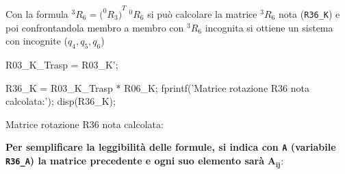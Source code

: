 \documentclass[11pt, a4paper]{article}
\begin{document}
\begin{par}
\begin{flushleft}
Con la formula $^3 R_6 ={\bigl(^0 R_3 \bigr)}^T \;^0 R_6$ si può calcolare la matrice $^3 R_6$ nota (\texttt{R36\_K}) e poi confrontandola membro a membro con $^3 R_6$ incognita si ottiene un sistema con incognite ($q_4 ,q_5 ,q_6$)
\end{flushleft}
\end{par}
\begin{matlabcode}
R03_K_Trasp = R03_K';

R36_K = R03_K_Trasp * R06_K;
fprintf('Matrice rotazione R36 nota calcolata:');
disp(R36_K);
\end{matlabcode}
\begin{matlaboutput}
Matrice rotazione R36 nota calcolata:
\end{matlaboutput}
\begin{matlabsymbolicoutput}
\end{matlabsymbolicoutput}
\newpage
\begin{par}
\begin{flushleft}
\textbf{Per semplificare la leggibilità delle formule, si indica con \texttt{A} (variabile \texttt{R36\_A}) la matrice precedente e ogni suo elemento sarà }$\mathbf{A_{ij}}$:
\end{flushleft}
\end{par}
\end{document}
